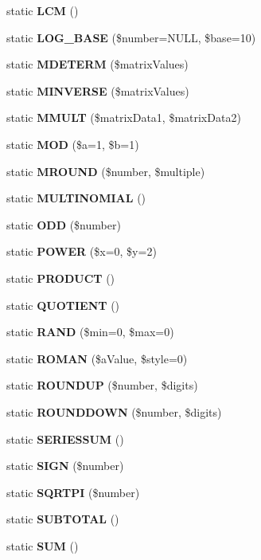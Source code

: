 \begin{DoxyCompactItemize}
\item 
static {\bfseries L\+C\+M} ()\label{class_p_h_p_excel___calculation___math_trig_a5cd7ad0dfbbc2298128319501b05a50f}

\item 
static {\bfseries L\+O\+G\+\_\+\+B\+A\+S\+E} (\$number=N\+U\+L\+L, \$base=10)\label{class_p_h_p_excel___calculation___math_trig_a304d6b6f8dd5d5e8388fcf9debcdb5e2}

\item 
static {\bfseries M\+D\+E\+T\+E\+R\+M} (\$matrix\+Values)\label{class_p_h_p_excel___calculation___math_trig_a35f4ca29c3b4a2c8c49bc8352c915f54}

\item 
static {\bfseries M\+I\+N\+V\+E\+R\+S\+E} (\$matrix\+Values)\label{class_p_h_p_excel___calculation___math_trig_a5475e9a16321a74b777ac8bb2680976c}

\item 
static {\bf M\+M\+U\+L\+T} (\$matrix\+Data1, \$matrix\+Data2)
\item 
static {\bf M\+O\+D} (\$a=1, \$b=1)
\item 
static {\bf M\+R\+O\+U\+N\+D} (\$number, \$multiple)
\item 
static {\bf M\+U\+L\+T\+I\+N\+O\+M\+I\+A\+L} ()
\item 
static {\bf O\+D\+D} (\$number)
\item 
static {\bf P\+O\+W\+E\+R} (\$x=0, \$y=2)
\item 
static {\bfseries P\+R\+O\+D\+U\+C\+T} ()\label{class_p_h_p_excel___calculation___math_trig_a84adcb8a959fddb2981d522f1ed3d934}

\item 
static {\bfseries Q\+U\+O\+T\+I\+E\+N\+T} ()\label{class_p_h_p_excel___calculation___math_trig_af96942a52525dba0b2c33531b0f735b2}

\item 
static {\bf R\+A\+N\+D} (\$min=0, \$max=0)
\item 
static {\bfseries R\+O\+M\+A\+N} (\$a\+Value, \$style=0)\label{class_p_h_p_excel___calculation___math_trig_ab87163748cc31403825ddfe40dc548a6}

\item 
static {\bf R\+O\+U\+N\+D\+U\+P} (\$number, \$digits)
\item 
static {\bf R\+O\+U\+N\+D\+D\+O\+W\+N} (\$number, \$digits)
\item 
static {\bf S\+E\+R\+I\+E\+S\+S\+U\+M} ()
\item 
static {\bf S\+I\+G\+N} (\$number)
\item 
static {\bf S\+Q\+R\+T\+P\+I} (\$number)
\item 
static {\bf S\+U\+B\+T\+O\+T\+A\+L} ()
\item 
static {\bfseries S\+U\+M} ()\label{class_p_h_p_excel___calculation___math_trig_a6ecea7455a5aa9d6cb27a9d25d2d1bc2}


\end{DoxyCompactItemize}
